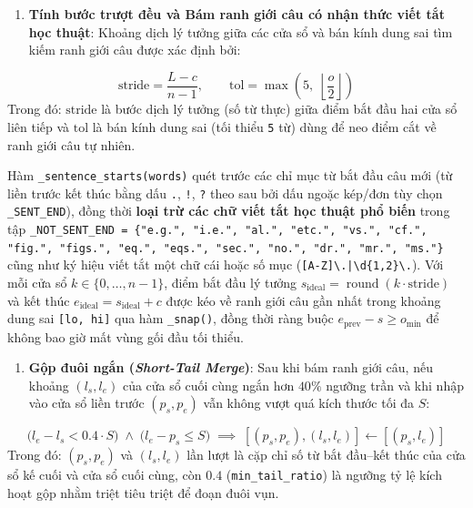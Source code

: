 \begin{enumerate}[label=\textbf{\arabic*.}, start=2]
  \item \textbf{Tính bước trượt đều và Bám ranh giới câu có nhận thức viết tắt học thuật}: Khoảng dịch lý tưởng giữa các cửa sổ và bán kính dung sai tìm kiếm ranh giới câu được xác định bởi:
\end{enumerate}
\begin{equation}
  \text{stride} = \frac{L - c}{n - 1}, \qquad \text{tol} = \max\!\left(5,\; \left\lfloor \frac{o}{2} \right\rfloor\right)
  \label{eq:ch2_chunk_stride}
\end{equation}
\noindent Trong đó: $\text{stride}$ là bước dịch lý tưởng (số từ thực) giữa điểm bắt đầu hai cửa sổ liên tiếp và $\text{tol}$ là bán kính dung sai (tối thiểu \texttt{5} từ) dùng để neo điểm cắt về ranh giới câu tự nhiên.

Hàm \texttt{\_sentence\_starts(words)} quét trước các chỉ mục từ bắt đầu câu mới (từ liền trước kết thúc bằng dấu \texttt{.}, \texttt{!}, \texttt{?} theo sau bởi dấu ngoặc kép/đơn tùy chọn \texttt{\_SENT\_END}), đồng thời \textbf{loại trừ các chữ viết tắt học thuật phổ biến} trong tập \texttt{\_NOT\_SENT\_END = \{"e.g.", "i.e.", "al.", "etc.", "vs.", "cf.", "fig.", "figs.", "eq.", "eqs.", "sec.", "no.", "dr.", "mr.", "ms."\}} cũng như ký hiệu viết tắt một chữ cái hoặc số mục (\texttt{[A-Z]\textbackslash.|\textbackslash d\{1,2\}\textbackslash.}). Với mỗi cửa sổ $k \in \{0, \dots, n-1\}$, điểm bắt đầu lý tưởng $s_{\text{ideal}} = \operatorname{round}(k \cdot \text{stride})$ và kết thúc $e_{\text{ideal}} = s_{\text{ideal}} + c$ được kéo về ranh giới câu gần nhất trong khoảng dung sai \texttt{[lo, hi]} qua hàm \texttt{\_snap()}, đồng thời ràng buộc $e_{\text{prev}} - s \ge o_{\min}$ để không bao giờ mất vùng gối đầu tối thiểu.

\begin{enumerate}[label=\textbf{\arabic*.}, start=3]
  \item \textbf{Gộp đuôi ngắn (\textit{Short-Tail Merge})}: Sau khi bám ranh giới câu, nếu khoảng $(l_s, l_e)$ của cửa sổ cuối cùng ngắn hơn $40\%$ ngưỡng trần và khi nhập vào cửa sổ liền trước $(p_s, p_e)$ vẫn không vượt quá kích thước tối đa $S$:
\end{enumerate}
\begin{equation}
  \bigl(l_e - l_s < 0.4 \cdot S\bigr) \;\land\; \bigl(l_e - p_s \le S\bigr) \;\implies\; [(p_s, p_e), (l_s, l_e)] \leftarrow [(p_s, l_e)]
  \label{eq:ch2_chunk_tail_merge}
\end{equation}
\noindent Trong đó: $(p_s, p_e)$ và $(l_s, l_e)$ lần lượt là cặp chỉ số từ bắt đầu--kết thúc của cửa sổ kế cuối và cửa sổ cuối cùng, còn $0.4$ (\texttt{min\_tail\_ratio}) là ngưỡng tỷ lệ kích hoạt gộp nhằm triệt tiêu triệt để đoạn đuôi vụn.

